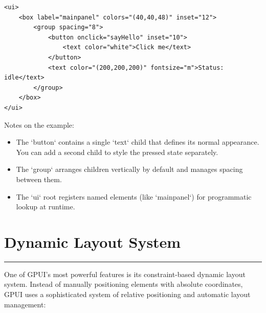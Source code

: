 \documentclass[a4paper,11pt]{article}
\begin{document}
\begin{verbatim}
<ui>
    <box label="mainpanel" colors="(40,40,48)" inset="12">
        <group spacing="8">
            <button onclick="sayHello" inset="10">
                <text color="white">Click me</text>
            </button>
            <text color="(200,200,200)" fontsize="m">Status: idle</text>
        </group>
    </box>
</ui>
\end{verbatim}

Notes on the example:
\begin{itemize}
    \item The `button` contains a single `text` child that defines its normal appearance. You can add a second child to style the pressed state separately.
    \item The `group` arranges children vertically by default and manages spacing between them.
    \item The `ui` root registers named elements (like `mainpanel`) for programmatic lookup at runtime.
\end{itemize}

\section*{Dynamic Layout System}
\vspace{-1.2em}
\rule{\linewidth}{0.4pt}
One of GPUI's most powerful features is its constraint-based dynamic layout system. Instead of manually positioning elements with absolute coordinates, GPUI uses a sophisticated system of relative positioning and automatic layout management:
\end{document}
